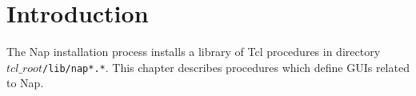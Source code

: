 
\section{Introduction}
\label{gui-intro}

The Nap installation process installs a library of Tcl procedures in directory
$\mathit{tcl\_root}$\texttt{/lib/nap*.*}.
This chapter describes procedures which define GUIs related to Nap.
